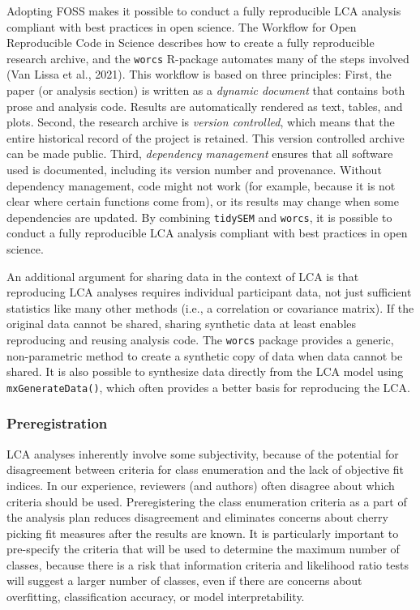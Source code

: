 \documentclass[
  ,man,floatsintext]{apa6}
\begin{document}
Adopting FOSS makes it possible to conduct a fully reproducible LCA analysis compliant with best practices in open science.
The Workflow for Open Reproducible Code in Science describes how to create a fully reproducible research archive,
and the \texttt{worcs} R-package automates many of the steps involved (Van Lissa et al., 2021).
This workflow is based on three principles: First,
the paper (or analysis section) is written as a \emph{dynamic document} that contains both prose and analysis code.
Results are automatically rendered as text, tables, and plots.
Second,
the research archive is \emph{version controlled}, which means that the entire historical record of the project is retained.
This version controlled archive can be made public.
Third, \emph{dependency management} ensures that all software used is documented, including its version number and provenance.
Without dependency management, code might not work (for example, because it is not clear where certain functions come from),
or its results may change when some dependencies are updated.
By combining \texttt{tidySEM} and \texttt{worcs},
it is possible to conduct a fully reproducible LCA analysis compliant with best practices in open science.

An additional argument for sharing data in the context of LCA is that reproducing LCA analyses requires individual participant data,
not just sufficient statistics like many other methods (i.e., a correlation or covariance matrix).
If the original data cannot be shared,
sharing synthetic data at least enables reproducing and reusing analysis code.
The \texttt{worcs} package provides a generic, non-parametric method to create a synthetic copy of data when data cannot be shared.
It is also possible to synthesize data directly from the LCA model using \texttt{mxGenerateData()},
which often provides a better basis for reproducing the LCA.

\hypertarget{preregistration}{%
\subsubsection{Preregistration}\label{preregistration}}

LCA analyses inherently involve some subjectivity,
because of the potential for disagreement between criteria for class enumeration and the lack of objective fit indices.
In our experience, reviewers (and authors) often disagree about which criteria should be used.
Preregistering the class enumeration criteria as a part of the analysis plan reduces disagreement and eliminates concerns about cherry picking fit measures after the results are known.
It is particularly important to pre-specify the criteria that will be used to determine the maximum number of classes,
because there is a risk that information criteria and likelihood ratio tests will suggest a larger number of classes, even if there are concerns about overfitting, classification accuracy, or model interpretability.
\end{document}
